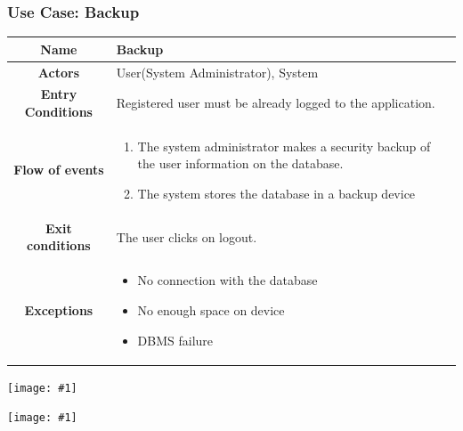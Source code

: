 \documentclass[11pt, a4paper,titlepage]{article}
\newcommand{\image}[1]{
	\begin{center}
		\noindent \texttt{[image: \#1]}
	\end{center}
	}
\begin{document}
\subsubsection{Use Case: Backup}
		\begin{tabularx}{\textwidth}{| c | X |}
			\hline
			\textbf{Name} & 
			Backup
			\\
			\hline
			\textbf{Actors} & 
			User(System Administrator), System  
			\\
			\hline
			\textbf{Entry Conditions} &
			Registered user must be already logged to the application. 
			\\
			\hline
			\textbf{Flow of events} & 
			\begin{enumerate}
				\item The system administrator makes a security backup of the user information on the database.
				\item The system stores the database in a backup device
			\end{enumerate}						
			\\
			\hline
			\textbf{Exit conditions} & 
			The user clicks on logout.
			\\
			\hline
			\textbf{Exceptions} & 
			\begin{itemize}
				\item No connection with the database
				\item No enough space on device
				\item DBMS failure
			\end{itemize} 
			\\
			\hline		
		\end{tabularx}
		\image{usecase_backup.png}
		\image{diagram_sequence_backup.png}
		\newpage
\end{document}
